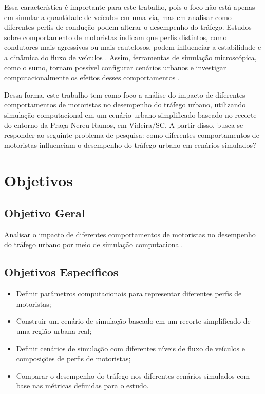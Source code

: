 Essa característica é importante para este trabalho, pois o foco não está apenas em simular a quantidade de veículos em uma via, mas em analisar como diferentes perfis de condução podem alterar o desempenho do tráfego. Estudos sobre comportamento de motoristas indicam que perfis distintos, como condutores mais agressivos ou mais cautelosos, podem influenciar a estabilidade e a dinâmica do fluxo de veículos \cite{zhai_2021}. Assim, ferramentas de simulação microscópica, como o \gls{sumo}, tornam possível configurar cenários urbanos e investigar computacionalmente os efeitos desses comportamentos \cite{lopez_2018}.

Dessa forma, este trabalho tem como foco a análise do impacto de diferentes comportamentos de motoristas no desempenho do tráfego urbano, utilizando simulação computacional em um cenário urbano simplificado baseado no recorte do entorno da Praça Nereu Ramos, em Videira/SC. A partir disso, busca-se responder ao seguinte problema de pesquisa: como diferentes comportamentos de motoristas influenciam o desempenho do tráfego urbano em cenários simulados?

\section{Objetivos}

\subsection{Objetivo Geral}

Analisar o impacto de diferentes comportamentos de motoristas no desempenho do tráfego urbano por meio de simulação computacional.

\subsection{Objetivos Específicos}

\begin{itemize}
    \item Definir parâmetros computacionais para representar diferentes perfis de motoristas;
    \item Construir um cenário de simulação baseado em um recorte simplificado de uma região urbana real;
    \item Definir cenários de simulação com diferentes níveis de fluxo de veículos e composições de perfis de motoristas;
    \item Comparar o desempenho do tráfego nos diferentes cenários simulados com base nas métricas definidas para o estudo.
\end{itemize}

